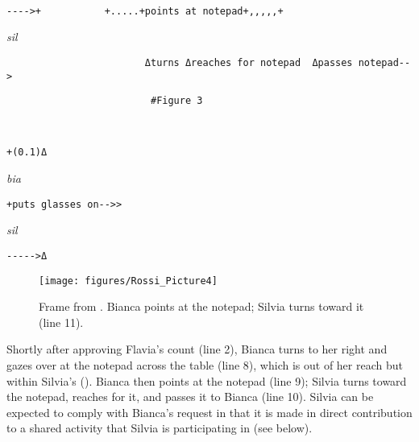 \documentclass[output=paper,modfonts]{langscibook}
\begin{document}
%
\begin{mdframednoverticalspace}[style=firstfoc]
\begin{transbox}{9}{~}
\begin{verbatim}
---->+           +.....+points at notepad+,,,,,+           
\end{verbatim}
\end{transbox}
\end{mdframednoverticalspace}
%
\begin{mdframednoverticalspace}[style=secondfoc]
\begin{transbox}{10}{\textit{sil}}
\begin{verbatim}
                        Δturns Δreaches for notepad  Δpasses notepad-->
\end{verbatim}
\end{transbox}
\end{mdframednoverticalspace}
%
\begin{transbox}{11}{\fig}
\begin{verbatim}
                         #Figure 3
\end{verbatim}
\end{transbox}\vspace{-1mm}
%
\begin{transbox}{12}{~}
\begin{verbatim}
+(0.1)Δ
\end{verbatim}
\end{transbox}
%
\begin{transbox}{13}{\textit{bia}}
\begin{verbatim}
+puts glasses on-->>
\end{verbatim}
\end{transbox}\vspace{-1mm}
%
\begin{transbox}{14}{\textit{sil}}
\begin{verbatim}
----->Δ
\end{verbatim}
\end{transbox}\bigskip

\begin{figure}
\centering
\texttt{[image: figures/Rossi\_Picture4]} %
\caption{Frame from . Bianca points at the notepad; Silvia turns toward it (line 11).}
\label{fig:rossi:3}
\end{figure}

Shortly after approving Flavia's count (line 2), Bianca turns to her right and gazes over at the notepad across the table (line 8), which is out of her reach but within Silvia's (). Bianca then points at the notepad (line 9); Silvia turns toward the notepad, reaches for it, and passes it to Bianca (line 10). Silvia can be expected to comply with Bianca's request in that it is made in direct contribution to a shared activity that Silvia is participating in (see  below).
\end{document}
